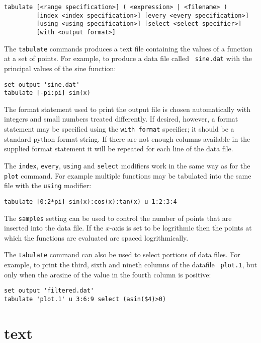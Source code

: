 \begin{verbatim}
tabulate [<range specification>] ( <expression> | <filename> )
         [index <index specification>] [every <every specification>]
         [using <using specification>] [select <select specifier>]
         [with <output format>]
\end{verbatim}

The {\tt tabulate} commands produces a text file containing the values of a
function at a set of points.  For example, to produce a data file called {\tt
sine.dat} with the principal values of the sine function:

\begin{verbatim}
set output 'sine.dat'
tabulate [-pi:pi] sin(x)
\end{verbatim}

The format statement used to print the output file is chosen automatically with
integers and small numbers treated differently.  If desired, however, a format
statement may be specified using the {\tt with format} specifier; it should be a
standard python format string.  If there are not enough columns available in the
supplied format statement it will be repeated for each line of the data file.

The {\tt index}, {\tt every}, {\tt using} and {\tt select} modifiers work in the
same way as for the {\tt plot} command.  For example multiple functions may be
tabulated into the same file with the {\tt using} modifier:

\begin{verbatim}
tabulate [0:2*pi] sin(x):cos(x):tan(x) u 1:2:3:4
\end{verbatim}

The {\tt samples} setting can be used to control the number of points that are
inserted into the data file.  If the $x$-axis is set to be logrithmic then the
points at which the functions are evaluated are spaced logrithmically.

The {\tt tabulate} command can also be used to select portions of data files.
For example, to print the third, sixth and nineth columns of the datafile {\tt
plot.1}, but only when the arcsine of the value in the fourth column is
positive:

\begin{verbatim}
set output 'filtered.dat'
tabulate 'plot.1' u 3:6:9 select (asin($4)>0)
\end{verbatim}

\section{text}

